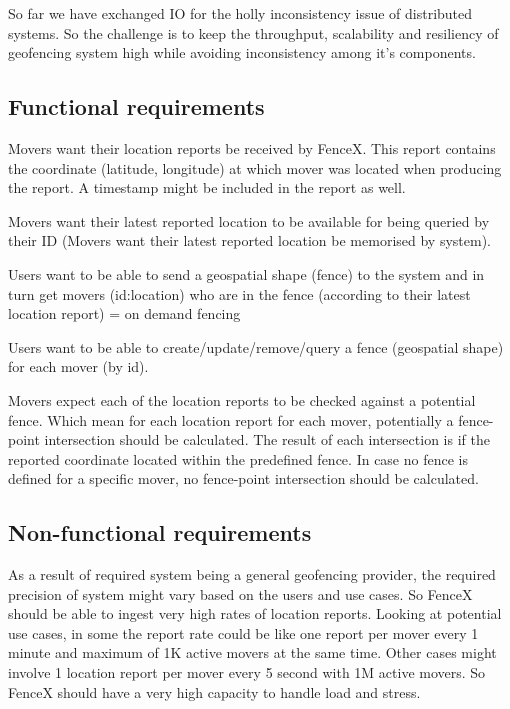 \documentclass[a4]{report}
\begin{document}
    So far we have exchanged IO for the holly inconsistency issue of distributed systems.
    So the challenge is to keep the throughput, scalability and resiliency of geofencing system high while avoiding
    inconsistency among it's components.

    \subsection{Functional requirements}
    Movers want their location reports be received by FenceX.
    This report contains the coordinate (latitude, longitude) at which mover was located when producing the report.
    A timestamp might be included in the report as well.

    Movers want their latest reported location to be available for being queried by their ID (Movers want their
    latest reported location be memorised by system).

    Users want to be able to send a geospatial shape (fence) to the system and in turn get movers (id:location) who
    are in the fence (according to their latest location report) = on demand fencing

    Users want to be able to create/update/remove/query a fence (geospatial shape) for each mover (by id).

    Movers expect each of the location reports to be checked against a potential fence.
    Which mean for each location report for each mover, potentially a fence-point intersection should be calculated.
    The result of each intersection is if the reported coordinate located within the predefined fence.
    In case no fence is defined for a specific mover, no fence-point intersection should be calculated.

    \subsection{Non-functional requirements}
    As a result of required system being a general geofencing provider, the required precision of system might vary
    based on the users and use cases.
    So FenceX should be able to ingest very high rates of location reports.
    Looking at potential use cases, in some the report rate could be like one report per mover every 1 minute and
    maximum of 1K active movers at the same time.
    Other cases might involve 1 location report per mover every 5 second with 1M active movers.
    So FenceX should have a very high capacity to handle load and stress.
\end{document}
